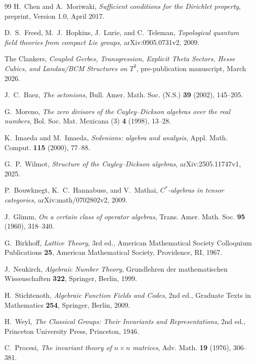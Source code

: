 \documentclass[11pt]{amsart}
\numberwithin{equation}{section}
\theoremstyle{definition}
\begin{document}
\begin{thebibliography}{99}
H.~Chen and A.~Moriwaki,
\emph{Sufficient conditions for the Dirichlet property},
preprint, Version 1.0, April 2017.

D.~S.~Freed, M.~J.~Hopkins, J.~Lurie, and C.~Teleman,
\emph{Topological quantum field theories from compact Lie groups},
arXiv:0905.0731v2, 2009.

The Clankers,
\emph{Coupled Gerbes, Transgression, Explicit Theta Sectors, Hesse Cubics,
and Landau/BCM Structures on $T^3$},
pre-publication manuscript, March 2026.

J.~C.~Baez,
\emph{The octonions},
Bull. Amer. Math. Soc. (N.S.) \textbf{39} (2002), 145--205.

G.~Moreno,
\emph{The zero divisors of the Cayley--Dickson algebras over the real
numbers},
Bol. Soc. Mat. Mexicana (3) \textbf{4} (1998), 13--28.

K.~Imaeda and M.~Imaeda,
\emph{Sedenions: algebra and analysis},
Appl. Math. Comput. \textbf{115} (2000), 77--88.

G.~P.~Wilmot,
\emph{Structure of the Cayley--Dickson algebras},
arXiv:2505.11747v1, 2025.

P.~Bouwknegt, K.~C.~Hannabuss, and V.~Mathai,
\emph{$C^*$-algebras in tensor categories},
arXiv:math/0702802v2, 2009.

J.~Glimm,
\emph{On a certain class of operator algebras},
Trans. Amer. Math. Soc. \textbf{95} (1960), 318--340.


G.~Birkhoff,
\emph{Lattice Theory},
3rd ed., American Mathematical Society Colloquium Publications
\textbf{25}, American Mathematical Society, Providence, RI, 1967.

J.~Neukirch,
\emph{Algebraic Number Theory},
Grundlehren der mathematischen Wissenschaften \textbf{322},
Springer, Berlin, 1999.

H.~Stichtenoth,
\emph{Algebraic Function Fields and Codes},
2nd ed., Graduate Texts in Mathematics \textbf{254}, Springer, Berlin,
2009.


H.~Weyl,
\emph{The Classical Groups: Their Invariants and Representations},
2nd ed., Princeton University Press, Princeton, 1946.

C.~Procesi,
\emph{The invariant theory of $n\times n$ matrices},
Adv. Math. \textbf{19} (1976), 306--381.


\end{thebibliography}
\end{document}
